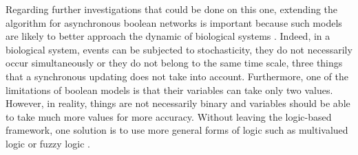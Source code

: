 \documentclass[oneside,a4paper,onecolumn,notitlepage,final]{article}
\begin{document}
Regarding further investigations that could be done on this one, extending the algorithm for asynchronous boolean networks is important because such models are likely to better approach the dynamic of biological systems \cite{saadatpour2010attractor}. Indeed, in a biological system, events can be subjected to stochasticity, they do not necessarily occur simultaneously or they do not belong to the same time scale, three things that a synchronous updating does not take into account. Furthermore, one of the limitations of boolean models is that their variables can take only two values. However, in reality, things are not necessarily binary and variables should be able to take much more values for more accuracy. Without leaving the logic-based framework, one solution is to use more general forms of logic such as multivalued logic or fuzzy logic \cite{zadeh1988fuzzy}.



\end{document}
